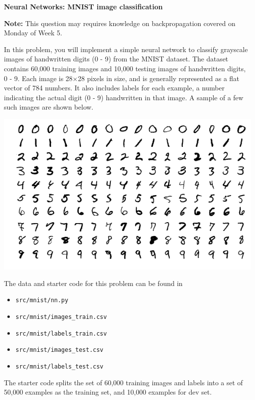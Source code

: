 \item {} {\bf Neural Networks: MNIST image classification}

{\bf Note:} This question may requires knowledge on backpropagation covered on Monday of Week 5.

In this problem, you will implement a simple neural network
to classify grayscale images of handwritten digits (0 - 9) from
the MNIST dataset. The dataset contains 60,000 training images and
10,000 testing images of handwritten digits, 0 - 9. Each image is
28$\times$28 pixels in size, and is generally represented as a flat
vector of 784 numbers. It also includes labels for each example, a number
indicating the actual digit (0 - 9) handwritten in that image. A sample of
a few such images are shown below.

\begin{center}
\includegraphics[scale=0.5]{mnist/mnist_plot}
\end{center}


The data and starter code for this problem can be found in

\begin{itemize}
\item \texttt{src/mnist/nn.py}
\item \texttt{src/mnist/images\_train.csv}
\item \texttt{src/mnist/labels\_train.csv}
\item \texttt{src/mnist/images\_test.csv}
\item \texttt{src/mnist/labels\_test.csv}
\end{itemize}

The starter code splits the set
of 60,000 training images and labels into a set of 50,000 examples as
the training set, and 10,000 examples for dev set.

